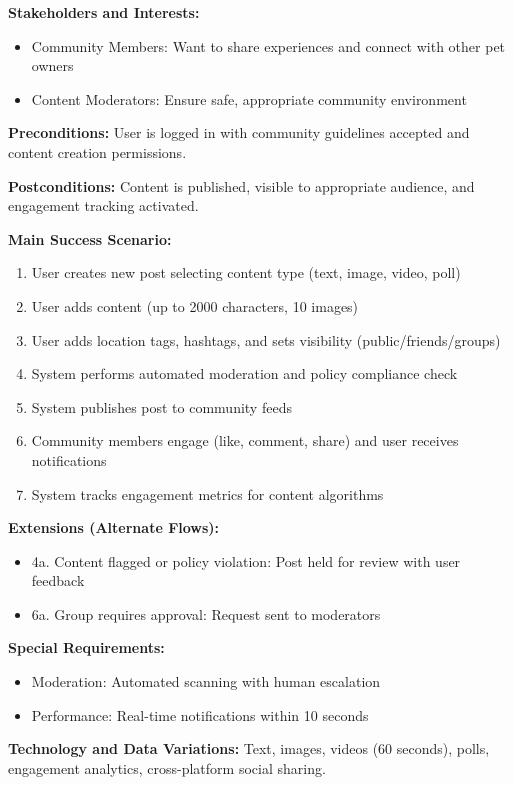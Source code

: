 \textbf{Stakeholders and Interests:}
\begin{itemize}
    \item Community Members: Want to share experiences and connect with other pet owners
    \item Content Moderators: Ensure safe, appropriate community environment
\end{itemize}

\textbf{Preconditions:} User is logged in with community guidelines accepted and content creation permissions.

\textbf{Postconditions:} Content is published, visible to appropriate audience, and engagement tracking activated.

\textbf{Main Success Scenario:}
\begin{enumerate}
    \item User creates new post selecting content type (text, image, video, poll)
    \item User adds content (up to 2000 characters, 10 images)
    \item User adds location tags, hashtags, and sets visibility (public/friends/groups)
    \item System performs automated moderation and policy compliance check
    \item System publishes post to community feeds
    \item Community members engage (like, comment, share) and user receives notifications
    \item System tracks engagement metrics for content algorithms
\end{enumerate}

\textbf{Extensions (Alternate Flows):}
\begin{itemize}
    \item 4a. Content flagged or policy violation: Post held for review with user feedback
    \item 6a. Group requires approval: Request sent to moderators
\end{itemize}

\textbf{Special Requirements:}
\begin{itemize}
    \item Moderation: Automated scanning with human escalation
    \item Performance: Real-time notifications within 10 seconds
\end{itemize}

\textbf{Technology and Data Variations:} Text, images, videos (60 seconds), polls, engagement analytics, cross-platform social sharing.

